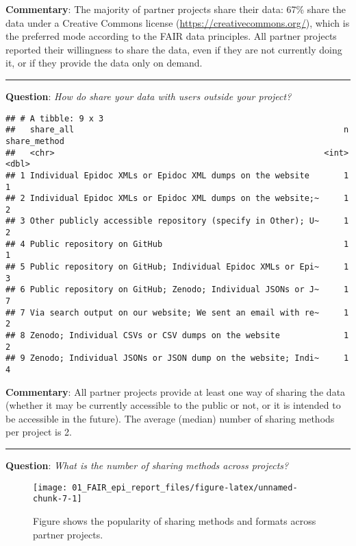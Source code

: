 \documentclass[
]{article}
\begin{document}
\textbf{Commentary}: The majority of partner projects share their data:
67\% share the data under a Creative Commons license
(\url{https://creativecommons.org/}), which is the preferred mode
according to the FAIR data principles. All partner projects reported
their willingness to share the data, even if they are not currently
doing it, or if they provide the data only on demand.

\begin{center}\rule{0.5\linewidth}{0.5pt}\end{center}

\textbf{Question}: \emph{How do share your data with users outside your
project?}

\begin{verbatim}
## # A tibble: 9 x 3
##   share_all                                                       n share_method
##   <chr>                                                       <int>        <dbl>
## 1 Individual Epidoc XMLs or Epidoc XML dumps on the website       1            1
## 2 Individual Epidoc XMLs or Epidoc XML dumps on the website;~     1            2
## 3 Other publicly accessible repository (specify in Other); U~     1            2
## 4 Public repository on GitHub                                     1            1
## 5 Public repository on GitHub; Individual Epidoc XMLs or Epi~     1            3
## 6 Public repository on GitHub; Zenodo; Individual JSONs or J~     1            7
## 7 Via search output on our website; We sent an email with re~     1            2
## 8 Zenodo; Individual CSVs or CSV dumps on the website             1            2
## 9 Zenodo; Individual JSONs or JSON dump on the website; Indi~     1            4
\end{verbatim}

\textbf{Commentary}: All partner projects provide at least one way of
sharing the data (whether it may be currently accessible to the public
or not, or it is intended to be accessible in the future). The average
(median) number of sharing methods per project is 2.

\begin{center}\rule{0.5\linewidth}{0.5pt}\end{center}

\textbf{Question}: \emph{What is the number of sharing methods across
projects?}

\begin{figure}

{\centering \texttt{[image: 01\_FAIR\_epi\_report\_files/figure-latex/unnamed-chunk-7-1]} 

}

\caption{Figure shows the popularity of sharing methods and formats across partner projects.}\label{fig:unnamed-chunk-7}
\end{figure}
\end{document}
